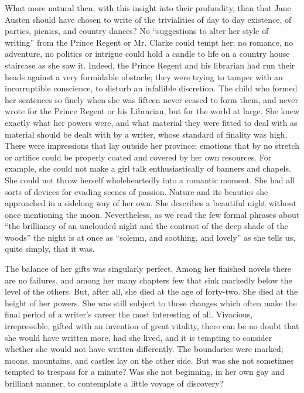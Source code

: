 What more natural then, with this insight into their profundity, than that Jane Austen should have chosen to write of the trivialities of day to day existence, of parties, picnics, and country dances? No ``suggestions to alter her style of writing'' from the Prince Regent or Mr. Clarke could tempt her; no romance, no adventure, no politics or intrigue could hold a candle to life on a country house staircase as she saw it. Indeed, the Prince Regent and his librarian had run their heads against a very formidable obstacle; they were trying to tamper with an incorruptible conscience, to disturb an infallible discretion. The child who formed her sentences so finely when she was fifteen never ceased to form them, and never wrote for the Prince Regent or his Librarian, but for the world at large. She knew exactly what her powers were, and what material they were fitted to deal with as material should be dealt with by a writer, whose standard of finality was high. There were impressions that lay outside her province; emotions that by no stretch or artifice could be properly coated and covered by her own resources. For example, she could not make a girl talk enthusiastically of banners and chapels. She could not throw herself wholeheartedly into a romantic moment. She had all sorts of devices for evading scenes of passion. Nature and its beauties she approached in a sidelong way of her own. She describes a beautiful night without once mentioning the moon. Nevertheless, as we read the few formal phrases about ``the brilliancy of an unclouded night and the contrast of the deep shade of the woods'' the night is at once as ``solemn, and soothing, and lovely'' as she tells us, quite simply, that it was.

The balance of her gifts was singularly perfect. Among her finished novels there are no failures, and among her many chapters few that sink markedly below the level of the others. But, after all, she died at the age of forty-two. She died at the height of her powers. She was still subject to those changes which often make the final period of a writer's career the most interesting of all. Vivacious, irrepressible, gifted with an invention of great vitality, there can be no doubt that she would have written more, had she lived, and it is tempting to consider whether she would not have written differently. The boundaries were marked; moons, mountains, and castles lay on the other side. But was she not sometimes tempted to trespass for a minute? Was she not beginning, in her own gay and brilliant manner, to contemplate a little voyage of discovery?

